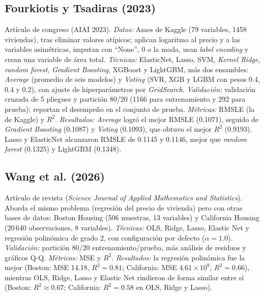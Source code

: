 \documentclass[journal]{IEEEtran}
\begin{document}
\subsection{Fourkiotis y Tsadiras (2023) \cite{fourkiotis2023}}
Artículo de congreso (AIAI 2023). \textit{Datos:} Ames de Kaggle (79 variables, 1458 viviendas), tras eliminar valores atípicos; aplican logaritmo al precio y a las variables asimétricas, imputan con ``None'', 0 o la moda, usan \textit{label encoding} y crean una variable de área total. \textit{Técnicas:} ElasticNet, Lasso, SVM, \textit{Kernel Ridge}, \textit{random forest}, \textit{Gradient Boosting}, XGBoost y LightGBM, más dos ensambles: \textit{Average} (promedio de seis modelos) y \textit{Voting} (SVR, XGB y LGBM con pesos 0.4, 0.4 y 0.2), con ajuste de hiperparámetros por \textit{GridSearch}. \textit{Validación:} validación cruzada de 5 pliegues y partición 80/20 (1166 para entrenamiento y 292 para prueba); reportan el desempeño en el conjunto de prueba. \textit{Métricas:} RMSLE (la de Kaggle) y $R^2$. \textit{Resultados:} \textit{Average} logró el mejor RMSLE (0.1071), seguido de \textit{Gradient Boosting} (0.1087) y \textit{Voting} (0.1093), que obtuvo el mejor $R^2$ (0.9193). Lasso y ElasticNet alcanzaron RMSLE de 0.1145 y 0.1146, mejor que \textit{random forest} (0.1325) y LightGBM (0.1348).

\subsection{Wang et al. (2026) \cite{wang2026}}
Artículo de revista (\textit{Science Journal of Applied Mathematics and Statistics}). Aborda el mismo problema (regresión del precio de vivienda) pero con otras bases de datos: Boston Housing (506 muestras, 13 variables) y California Housing (20\,640 observaciones, 8 variables). \textit{Técnicas:} OLS, Ridge, Lasso, Elastic Net y regresión polinómica de grado 2, con configuración por defecto ($\alpha=1.0$). \textit{Validación:} partición 80/20 entrenamiento/prueba, más análisis de residuos y gráficos Q-Q. \textit{Métricas:} MSE y $R^2$. \textit{Resultados:} la regresión polinómica fue la mejor (Boston: MSE 14.18, $R^2=0.81$; California: MSE $4.61\times10^{9}$, $R^2=0.66$), mientras OLS, Ridge, Lasso y Elastic Net rindieron de forma similar entre sí (Boston: $R^2\approx0.67$; California: $R^2=0.58$ en OLS, Ridge y Lasso).
\end{document}
